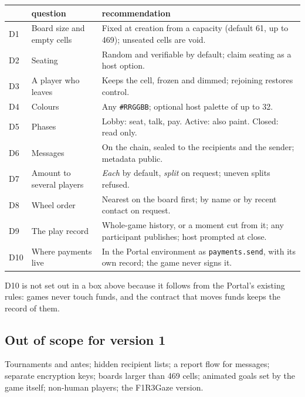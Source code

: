 \documentclass[11pt,a4paper]{article}
\newcommand{\code}[1]{\texttt{#1}}
\newcounter{req}
\begin{document}
\begin{center}\small
\begin{tabularx}{\linewidth}{@{}l>{\raggedright\arraybackslash}p{40mm}X@{}}
\toprule
 & question & recommendation\\
\midrule
D1 & Board size and empty cells & Fixed at creation from a capacity (default 61, up to 469); unseated cells are void.\\
D2 & Seating & Random and verifiable by default; claim seating as a host option.\\
D3 & A player who leaves & Keeps the cell, frozen and dimmed; rejoining restores control.\\
D4 & Colours & Any \code{\#RRGGBB}; optional host palette of up to 32.\\
D5 & Phases & Lobby: seat, talk, pay. Active: also paint. Closed: read only.\\
D6 & Messages & On the chain, sealed to the recipients and the sender; metadata public.\\
D7 & Amount to several players & \emph{Each} by default, \emph{split} on request; uneven splits refused.\\
D8 & Wheel order & Nearest on the board first; by name or by recent contact on request.\\
D9 & The play record & Whole-game history, or a moment cut from it; any participant publishes; host prompted at close.\\
D10 & Where payments live & In the Portal environment as \code{payments.send}, with its own record; the game never signs it.\\
\bottomrule
\end{tabularx}
\end{center}

D10 is not set out in a box above because it follows from the Portal's existing rules: games
never touch funds, and the contract that moves funds keeps the record of them.

\subsection{Out of scope for version 1}\label{sec:future}

Tournaments and antes; hidden recipient lists; a report flow for messages; separate encryption
keys; boards larger than 469 cells; animated goals set by the game itself; non-human players;
the F1R3Gaze version.
\end{document}

